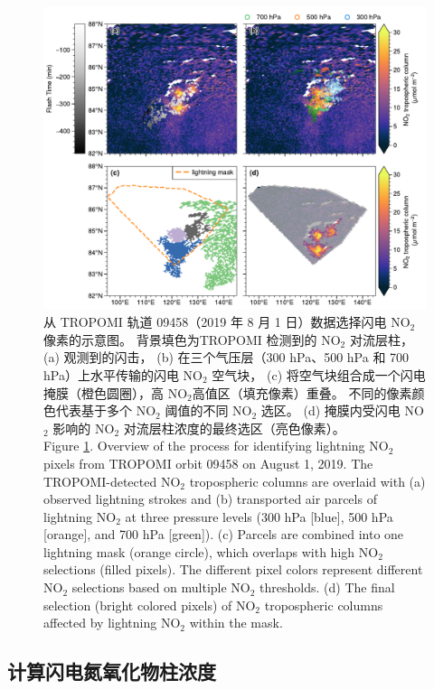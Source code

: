 \begin{figure}[!htbp]
\centering
\includegraphics[width=14cm]{./figures/arctic_workflow.pdf}
\caption{
从 TROPOMI 轨道 09458（2019 年 8 月 1 日）数据选择闪电 NO$_2$ 像素的示意图。
背景填色为TROPOMI 检测到的 NO$_2$ 对流层柱， (a) 观测到的闪击，
(b) 在三个气压层（300 hPa、500 hPa 和 700 hPa）上水平传输的闪电 NO$_2$ 空气块，
(c) 将空气块组合成一个闪电掩膜（橙色圆圈），高 NO$_2$高值区（填充像素）重叠。
不同的像素颜色代表基于多个 NO$_2$ 阈值的不同 NO$_2$ 选区。
(d) 掩膜内受闪电 NO$_2$ 影响的 NO$_2$ 对流层柱浓度的最终选区（亮色像素）。\\
Figure \ref{fig:workflow}. Overview of the process for identifying lightning NO$_2$ pixels from TROPOMI orbit 09458 on August 1, 2019.
The TROPOMI-detected NO$_2$ tropospheric columns are overlaid with (a) observed lightning strokes and
(b) transported air parcels of lightning NO$_2$ at three pressure levels (300 hPa [blue], 500 hPa [orange], and 700 hPa [green]).
(c) Parcels are combined into one lightning mask (orange circle), which overlaps with high NO$_2$ selections (filled pixels). The different pixel colors represent different NO$_2$ selections based on multiple NO$_2$ thresholds.
(d) The final selection (bright colored pixels) of NO$_2$ tropospheric columns affected by lightning NO$_2$ within the mask.
}
\label{fig:workflow}
\end{figure}

\subsection*{计算闪电氮氧化物柱浓度}

